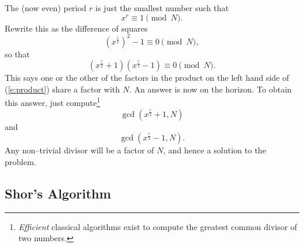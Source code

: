 The (now even) period $r$ is just the smallest number such that
\begin{equation}
x^r\equiv 1\pmod{N}.
\end{equation}
Rewrite this as the difference of squares
\begin{equation}
\left(x^\frac{r}{2}\right)^2 - 1 \equiv 0\pmod{N},
\end{equation}
so that
\begin{equation}
\left(x^\frac{r}{2} + 1\right)
\left(x^\frac{r}{2} - 1\right)
\equiv 0\pmod{N}.
\label{e:product}
\end{equation}
This says one or the other of the factors in the product on the left 
hand side of (\ref{e:product}) share a factor with $N$.  
An answer is now on the horizon.  To obtain this answer, just
compute\footnote{ 
\emph{Efficient} classical algorithms exist to compute the greatest
common divisor of two numbers\cite{Hardy/Wright:79}.
}
\begin{equation}
\gcd
\left(x^\frac{r}{2} + 1, N \right)
\end{equation}
and
\begin{equation}
\gcd
\left(x^\frac{r}{2} - 1, N \right).
\end{equation}
Any non--trivial divisor will be a factor of $N$,
and hence a solution to the problem.

\subsection{Shor's Algorithm}

